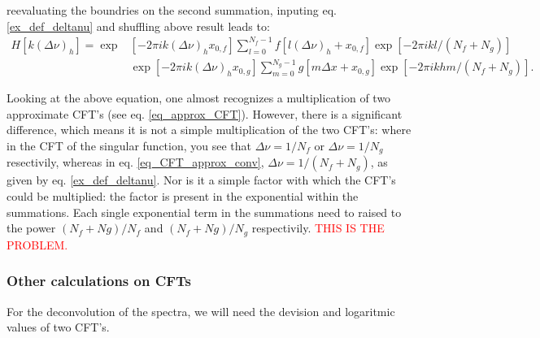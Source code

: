 reevaluating the boundries on the second summation, inputing eq. \eqref{ex_def_deltanu} and shuffling above result leads to:
\begin{equation}\label{eq_CFT_approx_conv}
\begin{aligned}
H[k(\Delta\nu)_h] = \operatorname{exp}&[-2\pi i k(\Delta\nu)_h x_{0,f}] \sum_{l=0}^{N_f-1} f[l(\Delta\nu)_h + x_{0,f}]\operatorname{exp}[-2\pi i k l/(N_f+N_g)] \\
& \operatorname{exp}[-2\pi i k(\Delta\nu)_h x_{0,g}]  \sum_{m=0}^{N_g-1}g[m\Delta x + x_{0,g}] \operatorname{exp}[-2\pi i kh m/(N_f+N_g)].
\end{aligned}
\end{equation}

Looking at the above equation, one almost recognizes a multiplication of two approximate CFT's (see eq. \eqref{eq_approx_CFT}). However, there is a significant difference, which means it is not a simple multiplication of the two CFT's: where in the CFT of the singular function, you see that $\Delta\nu = 1/N_f$ or $\Delta\nu = 1/N_g$ resectivily, whereas in eq. \eqref{eq_CFT_approx_conv}, $\Delta\nu = 1/(N_f + N_g)$, as given by eq. \eqref{ex_def_deltanu}. Nor is it a simple factor with which the CFT's could be multiplied: the factor is present in the exponential within the summations. Each single exponential term in the summations need to raised to the power $(N_f+Ng)/N_f$ and $(N_f+Ng)/N_g$ respectivily. \textcolor{red}{THIS IS THE PROBLEM.}



\subsubsection{Other calculations on CFTs}
For the deconvolution of the spectra, we will need the devision and logaritmic values of two CFT's. 














